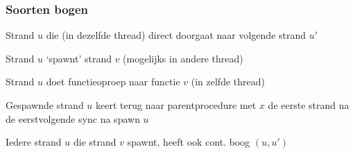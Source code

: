\documentclass
   [kulak] %
   {kulakbeamer}
\begin{document}
\begin{frame}
	\frametitle{Soorten bogen}
	\pause
	\begin{description}[align=parleft]
		\item[\textbf{Continuation boog $(u,u')$}]
		Strand $u$ die (in dezelfde thread) direct doorgaat naar volgende strand $u'$
		\pause
		\item[\textbf{Spawn boog $(u,v)$}]
		Strand $u$ `spawnt' strand $v$ (mogelijks in andere thread)
		\pause
		\item[\textbf{Call boog $(u,v)$}]
		Strand $u$ doet functieoproep naar functie $v$ (in zelfde thread)
		\pause
		\item[\textbf{Return boog $(u,x)$}]
		Gespawnde strand $u$ keert terug naar parentprocedure met $x$ de eerste strand na de eerstvolgende sync na spawn $u$
	\end{description}
	
	\pause
	
	Iedere strand $u$ die strand $v$ spawnt, heeft ook cont. boog $(u,u')$ 
\end{frame}
\end{document}

